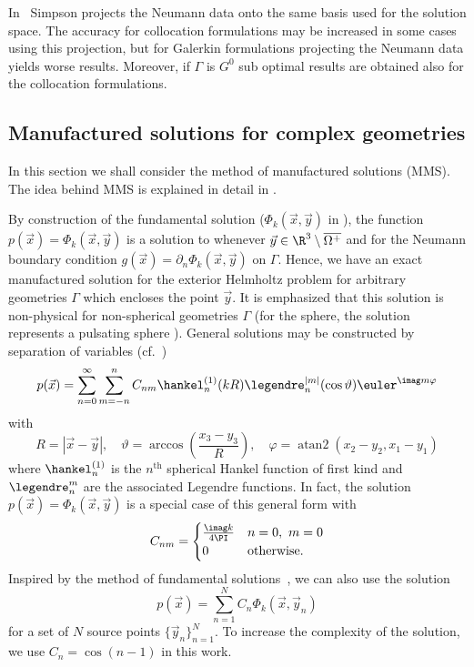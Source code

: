 In~\cite{Simpson2014aib} Simpson projects the Neumann data onto the same basis used for the solution space. The accuracy for collocation formulations may be increased in some cases using this projection, but for Galerkin formulations projecting the Neumann data yields worse results. Moreover, if $\Gamma$ is $G^0$ sub optimal results are obtained also for the collocation formulations.

\subsection{Manufactured solutions for complex geometries}
In this section we shall consider the method of manufactured solutions (MMS). The idea behind MMS is explained in detail in \cite{Roy2005roc}. 

By construction of the fundamental solution ($\Phi_k(\vec{x},\vec{y})$ in ), the function $p(\vec{x}) = \Phi_k(\vec{x},\vec{y})$ is a solution to  whenever $\vec{y}\in\R^3\setminus\overline{\Omega^+}$ and for the Neumann boundary condition $g(\vec{x})=\partial_n\Phi_k(\vec{x},\vec{y})$ on $\Gamma$.  Hence, we have an exact manufactured solution for the exterior Helmholtz problem for arbitrary geometries $\Gamma$ which encloses the point $\vec{y}$. It is emphasized that this solution is non-physical for non-spherical geometries $\Gamma$ (for the sphere, the solution represents a pulsating sphere \cite{Simpson2014aib}). General solutions may be constructed by separation of variables (cf.~\cite[p. 26]{Ihlenburg1998fea})
\begin{equation}
	p(\vec{x}) = \sum_{n=0}^\infty\sum_{m=-n}^n C_{nm} \hankel_n^{(1)}(kR) \legendre_n^{|m|}(\cos\vartheta)\euler^{\imag m\varphi} 
\end{equation}
with
\begin{equation*}
	R = |\vec{x}-\vec{y}|,\quad \vartheta=\arccos\left(\frac{x_3-y_3}{R}\right),\quad\varphi = \operatorname{atan2}(x_2-y_2,x_1-y_1)
\end{equation*}
where $\hankel_n^{(1)}$ is the $n^{\mathrm{th}}$ spherical Hankel function of first kind and $\legendre_n^m$ are the associated Legendre functions. In fact, the solution $p(\vec{x}) = \Phi_k(\vec{x},\vec{y})$ is a special case of this general form with 
\begin{equation}
	C_{nm} = \begin{cases}
		\frac{\imag k}{4\PI} & n = 0,\,\,m=0\\
		0 & \text{otherwise}.
		\end{cases}
\end{equation}
Inspired by the method of fundamental solutions~\cite{Fairweather2003tmo}, we can also use the solution
\begin{equation}\label{Eq3:manuMFS}
	p(\vec{x}) = \sum_{n=1}^N C_n \Phi_k(\vec{x},\vec{y}_n)
\end{equation}
for a set of $N$ source points $\{\vec{y}_n\}_{n=1}^N$. To increase the complexity of the solution, we use $C_n=\cos(n-1)$ in this work.

